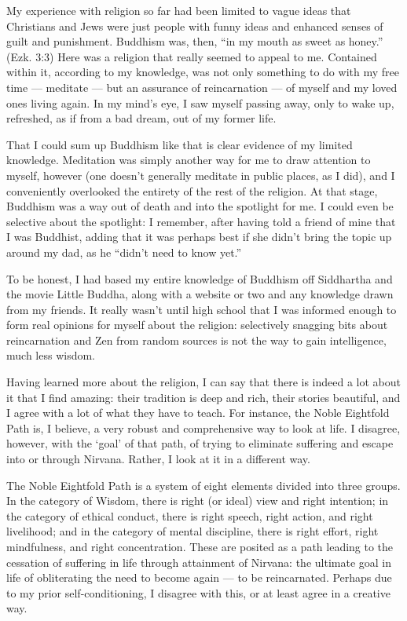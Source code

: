 My experience with religion so far had been limited to vague ideas that Christians and Jews were just people with funny ideas and enhanced senses of guilt and punishment. Buddhism was, then, ``in my mouth as sweet as honey.'' (Ezk. 3:3) Here was a religion that really seemed to appeal to me. Contained within it, according to my knowledge, was not only something to do with my free time --- meditate --- but an assurance of reincarnation --- of myself and my loved ones living again. In my mind's eye, I saw myself passing away, only to wake up, refreshed, as if from a bad dream, out of my former life.

That I could sum up Buddhism like that is clear evidence of my limited knowledge. Meditation was simply another way for me to draw attention to myself, however (one doesn't generally meditate in public places, as I did), and I conveniently overlooked the entirety of the rest of the religion. At that stage, Buddhism was a way out of death and into the spotlight for me. I could even be selective about the spotlight: I remember, after having told a friend of mine that I was Buddhist, adding that it was perhaps best if she didn't bring the topic up around my dad, as he ``didn't need to know yet.''

To be honest, I had based my entire knowledge of Buddhism off Siddhartha and the movie Little Buddha, along with a website or two and any knowledge drawn from my friends. It really wasn't until high school that I was informed enough to form real opinions for myself about the religion: selectively snagging bits about reincarnation and Zen from random sources is not the way to gain intelligence, much less wisdom.

Having learned more about the religion, I can say that there is indeed a lot about it that I find amazing: their tradition is deep and rich, their stories beautiful, and I agree with a lot of what they have to teach. For instance, the Noble Eightfold Path is, I believe, a very robust and comprehensive way to look at life. I disagree, however, with the `goal' of that path, of trying to eliminate suffering and escape into or through Nirvana. Rather, I look at it in a different way.

The Noble Eightfold Path is a system of eight elements divided into three groups. In the category of Wisdom, there is right (or ideal) view and right intention; in the category of ethical conduct, there is right speech, right action, and right livelihood; and in the category of mental discipline, there is right effort, right mindfulness, and right concentration. These are posited as a path leading to the cessation of suffering in life through attainment of Nirvana: the ultimate goal in life of obliterating the need to become again --- to be reincarnated. Perhaps due to my prior self-conditioning, I disagree with this, or at least agree in a creative way.

